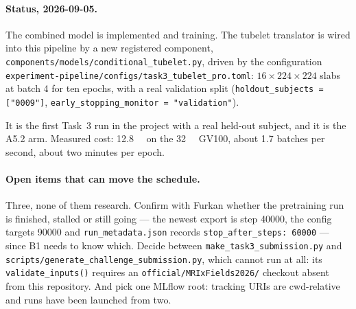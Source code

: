 \documentclass[11pt,a4paper]{article}
\begin{document}
\paragraph{Status, 2026-09-05.} {\sloppy{} The combined model is implemented and training. The tubelet
translator is wired into this pipeline by a new registered component,
\texttt{components/models/conditional\_tubelet.py}, driven by the configuration
\texttt{experiment-pipeline/configs/task3\_tubelet\_pro.toml}: $16 \times 224 \times 224$ slabs at batch
4 for ten epochs, with a real validation split (\texttt{holdout\_subjects = ["0009"]},
\texttt{early\_stopping\_monitor = "validation"}).\par} It is the first
Task~3 run in the project with a real held-out subject, and it is the A5.2 arm. Measured cost:
\SI{12.8}{\gibi\byte} on the \SI{32}{\giga\byte} GV100, about \num{1.7} batches per second, about two
minutes per epoch.

\paragraph{Open items that can move the schedule.} Three, none of them research. Confirm with Furkan
whether the pretraining run is finished, stalled or still going --- the newest export is step
\num{40000}, the config targets \num{90000} and \texttt{run\_metadata.json} records
\texttt{stop\_after\_steps: 60000} --- since B1 needs to know which. Decide between
\texttt{make\_task3\_submission.py} and \texttt{scripts/generate\_challenge\_submission.py}, which cannot
run at all: its \texttt{validate\_inputs()} requires an \texttt{official/MRIxFields2026/} checkout absent
from this repository. And pick one MLflow root: tracking URIs are cwd-relative and runs have been
launched from two.
\end{document}
